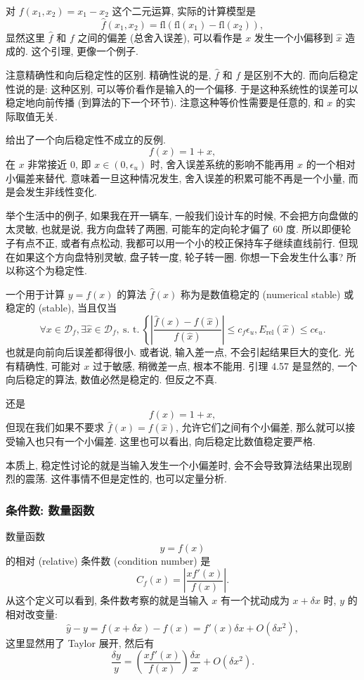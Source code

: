 \documentclass[a4paper]{ctexart}
\begin{document}
{ 对 $f(x_1, x_2) = x_1 - x_2$ 这个二元运算, 实际的计算模型是
$$
\hat{f}(x_1, x_2) = \mbox{fl}(\mbox{fl}(x_1) - \mbox{fl}(x_2)),
$$
显然这里 $\hat{f}$ 和 $f$ 之间的偏差 (总舍入误差), 可以看作是 $x$ 发生一个小偏移到
$\hat{x}$ 造成的. 这个引理, 更像一个例子.

注意精确性和向后稳定性的区别. 精确性说的是, $\hat{f}$ 和 $f$ 是区别不大的.
而向后稳定性说的是: 这种区别, 可以等价看作是输入的一个偏移.
于是这种系统性的误差可以稳定地向前传播 (到算法的下一个环节).
注意这种等价性需要是任意的, 和 $x$ 的实际取值无关.

 给出了一个向后稳定性不成立的反例.
$$
f(x) = 1 + x,
$$
在 $x$ 非常接近 $0$, 即 $x \in (0, \epsilon_u)$ 时, 舍入误差系统的影响不能再用
$x$ 的一个相对小偏差来替代. 意味着一旦这种情况发生, 舍入误差的积累可能不再是一个小量,
而是会发生非线性变化.

举个生活中的例子, 如果我在开一辆车, 一般我们设计车的时候, 不会把方向盘做的太灵敏,
也就是说, 我方向盘转了两圈, 可能车的定向轮才偏了 60 度. 所以即便轮子有点不正,
或者有点松动, 我都可以用一个小的校正保持车子继续直线前行. 但现在如果这个方向盘特别灵敏,
盘子转一度, 轮子转一圈. 你想一下会发生什么事? 所以称这个为稳定性.

 一个用于计算 $y = f(x)$ 的算法 $\hat{f}(x)$
称为是数值稳定的 (numerical stable) 或稳定的 (stable), 当且仅当
$$
\forall x \in \mathscr{D}_f, \exists \hat{x} \in \mathscr{D}_f,
~\mbox{s. t.}~ \left\{
\left|\frac{\hat{f}(x) - f(\hat{x})}{f(\hat{x})}\right| \leq c_f \epsilon_u,
E_{\mbox{rel}}(\hat{x}) \leq c \epsilon_u.
\right.
$$
也就是向前向后误差都得很小. 或者说, 输入差一点, 不会引起结果巨大的变化. 光有精确性,
可能对 $x$ 过于敏感, 稍微差一点, 根本不能用. 引理 4.57 是显然的, 一个向后稳定的算法,
数值必然是稳定的. 但反之不真.

 还是
$$
f(x) = 1 + x,
$$
但现在我们如果不要求 $\hat{f}(x) = f(\hat{x})$, 允许它们之间有个小偏差,
那么就可以接受输入也只有一个小偏差. 这里也可以看出, 向后稳定比数值稳定要严格.

本质上, 稳定性讨论的就是当输入发生一个小偏差时, 会不会导致算法结果出现剧烈的震荡.
这件事情不但是定性的, 也可以定量分析.

\subsubsection{条件数: 数量函数}

 数量函数
$$
y = f(x)
$$
的相对 (relative) 条件数 (condition number) 是
$$
C_f(x) = \left|\frac{x f'(x)}{f(x)}\right|.
$$
从这个定义可以看到, 条件数考察的就是当输入 $x$ 有一个扰动成为 $x + \delta x$ 时,
$y$ 的相对改变量:
$$
\hat{y} - y = f(x + \delta x) - f(x) = f'(x)\delta x + O(\delta x^2),
$$
这里显然用了 Taylor 展开, 然后有
$$
\frac{\delta y}{y} = \left(\frac{x f'(x)}{f(x)}\right)\frac{\delta x}{x}
+ O(\delta x^2).
$$

}
\end{document}
